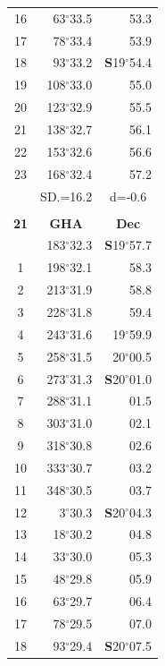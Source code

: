\documentclass[10pt, a4paper]{report}
\begin{document}
\begin{scriptsize}
\begin{tabular*}{0.2\textwidth}[t]{@{\extracolsep{\fill}}|c|rr|}
16 & 63$^\circ$33.5 & 53.3\\
17 & 78$^\circ$33.4 & 53.9\\[2Pt]
18 & 93$^\circ$33.2 & \textbf{S}19$^\circ$54.4\\
19 & 108$^\circ$33.0 & 55.0\\
20 & 123$^\circ$32.9 & 55.5\\
21 & 138$^\circ$32.7 & \raisebox{0.24ex}{\boldmath$\cdot$~\boldmath$\cdot$~~}56.1\\
22 & 153$^\circ$32.6 & 56.6\\
23 & 168$^\circ$32.4 & 57.2\\
\hline
\rule{0pt}{2.4ex} & \multicolumn{1}{c}{SD.=16.2} & \multicolumn{1}{c|}{d=-0.6}\\
\hline
\multicolumn{1}{c}{}\\[-0.5ex]\hline
\multicolumn{1}{|c|}{\rule{0pt}{2.6ex}\textbf{21}} & \multicolumn{1}{c}{\textbf{GHA}} & \multicolumn{1}{c|}{\textbf{Dec}}\\
\hline\rule{0pt}{2.6ex}\noindent
0 & 183$^\circ$32.3 & \textbf{S}19$^\circ$57.7\\
1 & 198$^\circ$32.1 & 58.3\\
2 & 213$^\circ$31.9 & 58.8\\
3 & 228$^\circ$31.8 & \raisebox{0.24ex}{\boldmath$\cdot$~\boldmath$\cdot$~~}59.4\\
4 & 243$^\circ$31.6 & 19$^\circ$59.9\\
5 & 258$^\circ$31.5 & 20$^\circ$00.5\\[2Pt]
6 & 273$^\circ$31.3 & \textbf{S}20$^\circ$01.0\\
7 & 288$^\circ$31.1 & 01.5\\
8 & 303$^\circ$31.0 & 02.1\\
9 & 318$^\circ$30.8 & \raisebox{0.24ex}{\boldmath$\cdot$~\boldmath$\cdot$~~}02.6\\
10 & 333$^\circ$30.7 & 03.2\\
11 & 348$^\circ$30.5 & 03.7\\[2Pt]
12 & 3$^\circ$30.3 & \textbf{S}20$^\circ$04.3\\
13 & 18$^\circ$30.2 & 04.8\\
14 & 33$^\circ$30.0 & 05.3\\
15 & 48$^\circ$29.8 & \raisebox{0.24ex}{\boldmath$\cdot$~\boldmath$\cdot$~~}05.9\\
16 & 63$^\circ$29.7 & 06.4\\
17 & 78$^\circ$29.5 & 07.0\\[2Pt]
18 & 93$^\circ$29.4 & \textbf{S}20$^\circ$07.5\\

\end{tabular*}
\end{scriptsize}
\end{document}
